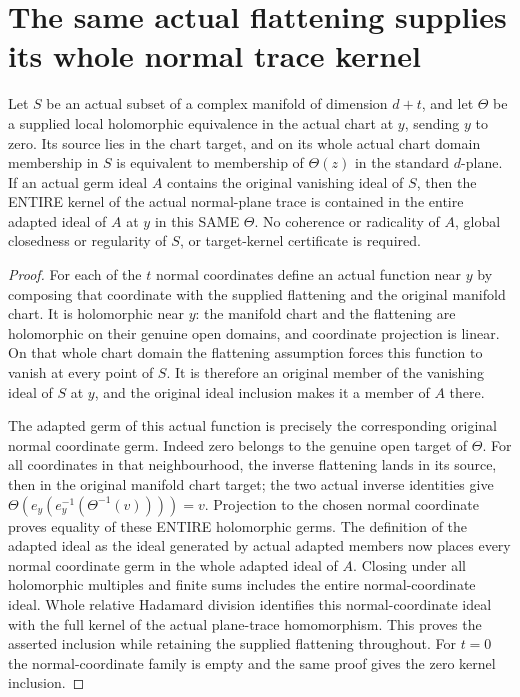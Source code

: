 \section{The same actual flattening supplies its whole normal trace kernel}
\begin{theorem}
\label{hir:disjoint-same-flattening-normal-kernel}
\leanok
Let $S$ be an actual subset of a complex manifold of dimension $d+t$, and
let $\Theta$ be a supplied local holomorphic equivalence in the actual chart
at $y$, sending $y$ to zero. Its source lies in the chart target, and on its
whole actual chart domain membership in $S$ is equivalent to membership of
$\Theta(z)$ in the standard $d$-plane. If an actual germ ideal $A$ contains
the original vanishing ideal of $S$, then the ENTIRE kernel of the actual
normal-plane trace is contained in the entire adapted ideal of $A$ at $y$
in this SAME $\Theta$. No coherence or radicality of $A$, global closedness
or regularity of $S$, or target-kernel certificate is required.
\end{theorem}
\begin{proof}
For each of the $t$ normal coordinates define an actual function near $y$
by composing that coordinate with the supplied flattening and the original
manifold chart. It is holomorphic near $y$: the manifold chart and the
flattening are holomorphic on their genuine open domains, and coordinate
projection is linear. On that whole chart domain the flattening assumption
forces this function to vanish at every point of $S$. It is therefore an
original member of the vanishing ideal of $S$ at $y$, and the original ideal
inclusion makes it a member of $A$ there.

The adapted germ of this actual function is precisely the corresponding
original normal coordinate germ. Indeed zero belongs to the genuine open
target of $\Theta$. For all coordinates in that neighbourhood, the inverse
flattening lands in its source, then in the original manifold chart target;
the two actual inverse identities give
$\Theta(e_y(e_y^{-1}(\Theta^{-1}(v))))=v$. Projection to the chosen normal
coordinate proves equality of these ENTIRE holomorphic germs. The definition
of the adapted ideal as the ideal generated by actual adapted members now
places every normal coordinate germ in the whole adapted ideal of $A$.
Closing under all holomorphic multiples and finite sums includes the entire
normal-coordinate ideal. Whole relative Hadamard division identifies this
normal-coordinate ideal with the full kernel of the actual plane-trace
homomorphism. This proves the asserted inclusion while retaining the supplied
flattening throughout. For $t=0$ the normal-coordinate family is empty and
the same proof gives the zero kernel inclusion.
\end{proof}
